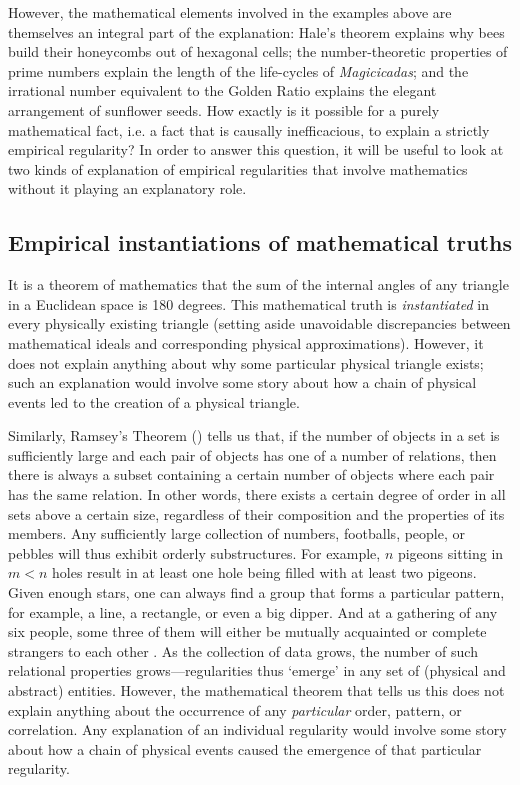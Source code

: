 \documentclass[a4paper,12pt]{article}
\begin{document}
However, the mathematical elements involved in the examples above are themselves an integral part of the explanation:
Hale's theorem explains why bees build their honeycombs out of hexagonal cells; the number-theoretic properties of prime numbers explain the length of the life-cycles of \textit{Magicicadas}; and the irrational number equivalent to the Golden Ratio explains the elegant arrangement of sunflower seeds. How exactly is it possible for a purely mathematical fact, i.e. a fact that is causally inefficacious, to explain a strictly empirical regularity? In order to answer this question, it will be useful to look at two kinds of explanation of empirical regularities that involve mathematics without it playing an explanatory role.

\subsection{Empirical instantiations of mathematical truths}
It is a theorem of mathematics that the sum of the internal angles of any triangle in a Euclidean space is 180 degrees. This mathematical truth is \textit{instantiated} in every physically existing triangle (setting aside unavoidable discrepancies between mathematical ideals and corresponding physical approximations). However, it does not explain anything about why some particular physical triangle exists; such an explanation would involve some story about how a chain of physical events led to the creation of a physical triangle.

Similarly, Ramsey's Theorem (\citeyear{Ramsey1930}) tells us that, if the number of objects in a set is sufficiently large and each pair of objects has one of a number of relations, then there is always a subset containing a certain number of objects where each pair has the same relation. In other words,
there exists a certain degree of order in all sets above a certain size, regardless of their composition and the properties of its members. Any sufficiently large collection of numbers, footballs, people, or pebbles will thus exhibit orderly substructures. For example, $n$ pigeons sitting in $m<n$ holes result in at least one hole being filled with at least two pigeons. Given enough stars, one can always find a group that forms a particular pattern, for example, a line, a rectangle, or even a big dipper. And at a gathering of any six people, some three of them will either be mutually acquainted or complete strangers to each other \cite{Greenwood-Gleason-55,Bostwick-1959}.
As the collection of data grows, the number of such relational properties grows---regularities thus `emerge' in any set of (physical and abstract) entities. However, the mathematical theorem that tells us this does not explain anything about the occurrence of any \textit{particular} order, pattern, or correlation. Any explanation of an individual regularity would involve some story about how a chain of physical events caused the emergence of that particular regularity.
\end{document}
